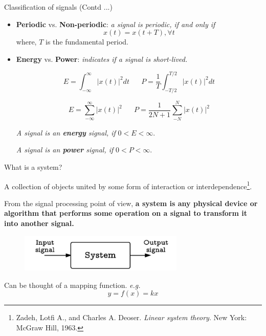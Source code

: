 \documentclass{beamer}
\begin{document}
\begin{frame}{Classification of signals (Contd ...)}
\begin{itemize}
\item \textbf{Periodic} vs. \textbf{Non-periodic}: \textit{a signal is periodic, if and only if}
\[x\left(t\right) = x\left(t + T\right), \forall t\]
where, $T$ is the fundamental period.
\item \textbf{Energy} vs. \textbf{Power}: \textit{indicates if a signal is short-lived.}

\[ E = \int_{-\infty}^{\infty}\left|x(t)\right|^2dt \,\,\,\,\,\,\,\,\,\, P=\frac{1}{T}\int_{-T/2}^{T/2}\left|x(t)\right|^2dt \]

\[ E = \sum_{-\infty}^{\infty}\left|x(t)\right|^2 \,\,\,\,\,\,\,\,\,\, P=\frac{1}{2N+1}\sum_{-N}^{N}\left|x(t)\right|^2 \]

\textit{A signal is an \textbf{energy} signal, if} $0 < E < \infty$.

\textit{A signal is an \textbf{power} signal, if} $0 < P < \infty$.
\end{itemize}
\end{frame}

\begin{frame}{What is a system?}

A collection of objects united by some form of interaction or interdependence\footnote{Zadeh, Lotfi A., and Charles A. Deoser. \textit{Linear system theory}. New York: McGraw Hill, 1963.}.

\vspace{4mm}

From the signal processing point of view, \textbf{a system is any physical device or algorithm that performs some operation on a signal to transform it into another signal.}

\begin{figure}
\includegraphics[width=0.7\textwidth]{img/system.png}
\end{figure}

Can be thought of a mapping function. \textit{e.g.}
\[ y = f\left(x\right) = kx \]

\end{frame}
\end{document}
